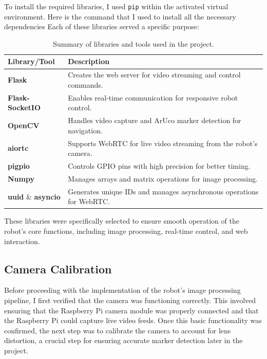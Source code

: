 To install the required libraries, I used \texttt{pip} within the activated virtual environment. Here is the command that I used to install all the necessary dependencies Each of these libraries served a specific purpose:

\begin{table}[H]
	\centering
	\begin{tabular}{|p{3cm}|p{12cm}|}
		\hline
		\textbf{Library/Tool} & \textbf{Description} \\ 
		\hline
		\textbf{Flask} & Creates the web server for video streaming and control commands. \\ 
		\hline
		\textbf{Flask-SocketIO} & Enables real-time communication for responsive robot control. \\ 
		\hline
		\textbf{OpenCV} & Handles video capture and ArUco marker detection for navigation. \\ 
		\hline
		\textbf{aiortc} & Supports WebRTC for live video streaming from the robot's camera. \\ 
		\hline
		\textbf{pigpio} & Controls GPIO pins with high precision for better timing. \\ 
		\hline
		\textbf{Numpy} & Manages arrays and matrix operations for image processing. \\ 
		\hline
		\textbf{uuid} \& \textbf{asyncio} & Generates unique IDs and manages asynchronous operations for WebRTC. \\ 
		\hline
	\end{tabular}
	\caption{Summary of libraries and tools used in the project.}
	\label{tab:libs}
\end{table}



These libraries were specifically selected to ensure smooth operation of the robot’s core functions, including image processing, real-time control, and web interaction. 

\subsection{Camera Calibration}

Before proceeding with the implementation of the robot’s image processing pipeline, I first verified that the camera was functioning correctly. This involved ensuring that the Raspberry Pi camera module was properly connected and that the Raspberry Pi could capture live video feeds. Once this basic functionality was confirmed, the next step was to calibrate the camera to account for lens distortion, a crucial step for ensuring accurate marker detection later in the project.

